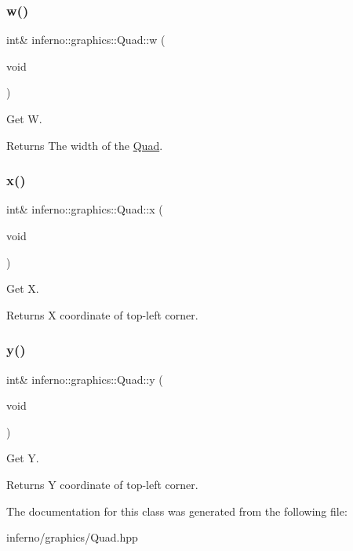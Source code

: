 \subsubsection{\texorpdfstring{w()}{w()}}
{\footnotesize\ttfamily int\& inferno\+::graphics\+::\+Quad\+::w (\begin{DoxyParamCaption}\item[{void}]{ }\end{DoxyParamCaption})\hspace{0.3cm}{\ttfamily [inline]}}



Get W. 

\begin{DoxyReturn}{Returns}
The width of the \mbox{\hyperlink{classinferno_1_1graphics_1_1_quad}{Quad}}. 
\end{DoxyReturn}
\mbox{\label{classinferno_1_1graphics_1_1_quad_aed2540662e5f85e5ab467517dccaf90f}} 
\subsubsection{\texorpdfstring{x()}{x()}}
{\footnotesize\ttfamily int\& inferno\+::graphics\+::\+Quad\+::x (\begin{DoxyParamCaption}\item[{void}]{ }\end{DoxyParamCaption})\hspace{0.3cm}{\ttfamily [inline]}}



Get X. 

\begin{DoxyReturn}{Returns}
X coordinate of top-\/left corner. 
\end{DoxyReturn}
\mbox{\label{classinferno_1_1graphics_1_1_quad_af653ab1040d4647e88487287765f7404}} 
\subsubsection{\texorpdfstring{y()}{y()}}
{\footnotesize\ttfamily int\& inferno\+::graphics\+::\+Quad\+::y (\begin{DoxyParamCaption}\item[{void}]{ }\end{DoxyParamCaption})\hspace{0.3cm}{\ttfamily [inline]}}



Get Y. 

\begin{DoxyReturn}{Returns}
Y coordinate of top-\/left corner. 
\end{DoxyReturn}


The documentation for this class was generated from the following file\+:\begin{DoxyCompactItemize}
\item 
inferno/graphics/Quad.\+hpp\end{DoxyCompactItemize}
